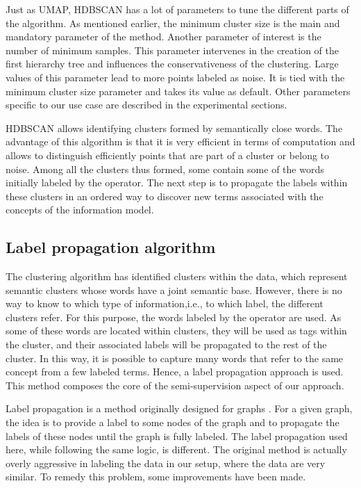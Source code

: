 Just as UMAP, HDBSCAN has a lot of parameters to tune the different parts of the algorithm.
As mentioned earlier, the minimum cluster size is the main and mandatory parameter of the method.
Another parameter of interest is the number of minimum samples.
This parameter intervenes in the creation of the first hierarchy tree and influences the conservativeness of the clustering.
Large values of this parameter lead to more points labeled as noise.
It is tied with the minimum cluster size parameter and takes its value as default.
Other parameters specific to our use case are described in the experimental sections.

HDBSCAN allows identifying clusters formed by semantically close words.
The advantage of this algorithm is that it is very efficient in terms of computation and allows to distinguish efficiently points that are part of a cluster or belong to noise.
Among all the clusters thus formed, some contain some of the words initially labeled by the operator.
The next step is to propagate the labels within these clusters in an ordered way to discover new terms associated with the concepts of the information model.

\subsection{Label propagation algorithm}
The clustering algorithm has identified clusters within the data, which represent semantic clusters whose words have a joint semantic base.
However, there is no way to know to which type of information,i.e., to which label, the different clusters refer.
For this purpose, the words labeled by the operator are used.
As some of these words are located within clusters, they will be used as tags within the cluster, and their associated labels will be propagated to the rest of the cluster.
In this way, it is possible to capture many words that refer to the same concept from a few labeled terms.
Hence, a label propagation approach is used.
This method composes the core of the semi-supervision aspect of our approach.

Label propagation is a method originally designed for graphs \parencite{zhuLearningLabeledUnlabeled2002}.
For a given graph, the idea is to provide a label to some nodes of the graph and to propagate the labels of these nodes until the graph is fully labeled.
The label propagation used here, while following the same logic, is different.
The original method is actually overly aggressive in labeling the data in our setup, where the data are very similar.
To remedy this problem, some improvements have been made.

